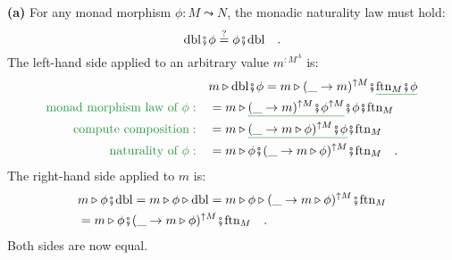 \textbf{(a)} For any monad morphism $\phi:M\leadsto N$, the monadic
naturality law must hold:
\[
\text{dbl}\bef\phi\overset{?}{=}\phi\bef\text{dbl}\quad.
\]
The left-hand side applied to an arbitrary value $m^{:M^{A}}$ is:
\begin{align*}
 & m\triangleright\text{dbl}\bef\phi=m\triangleright(\_\rightarrow m)^{\uparrow M}\bef\gunderline{\text{ftn}_{M}\bef\phi}\\
{\color{greenunder}\text{monad morphism law of }\phi:}\quad & =m\triangleright\gunderline{(\_\rightarrow m)^{\uparrow M}\bef\phi^{\uparrow M}}\bef\phi\bef\text{ftn}_{M}\\
{\color{greenunder}\text{compute composition}:}\quad & =m\triangleright\gunderline{(\_\rightarrow m\triangleright\phi)^{\uparrow M}\bef\phi}\bef\text{ftn}_{M}\\
{\color{greenunder}\text{naturality of }\phi:}\quad & =m\triangleright\phi\bef(\_\rightarrow m\triangleright\phi)^{\uparrow M}\bef\text{ftn}_{M}\quad.
\end{align*}
The right-hand side applied to $m$ is:
\begin{align*}
 & m\triangleright\phi\bef\text{dbl}=m\triangleright\phi\triangleright\text{dbl}=m\triangleright\phi\triangleright(\_\rightarrow m\triangleright\phi)^{\uparrow M}\bef\text{ftn}_{M}\\
 & =m\triangleright\phi\bef(\_\rightarrow m\triangleright\phi)^{\uparrow M}\bef\text{ftn}_{M}\quad.
\end{align*}
Both sides are now equal.

